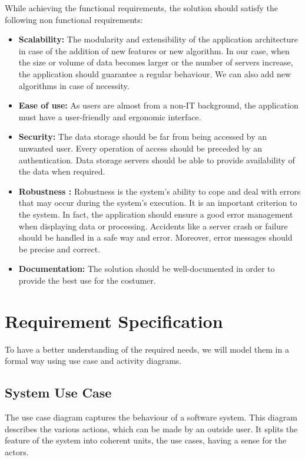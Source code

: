 While achieving the functional requirements, the solution should satisfy the following non functional requirements:
\begin{itemize}
\item \textbf{Scalability:} The modularity and extensibility of the application architecture in case of the addition of new features or new algorithm. In our case, when the size or volume of data becomes larger or the number of servers increase, the application should guarantee a regular behaviour. We can also add new algorithms in case of necessity. 
\item \textbf{Ease of use:} As users are almost from a non-IT background, the application must have a user-friendly and ergonomic interface.
\item \textbf{Security:} The data storage should be far from being accessed by an unwanted user. Every operation of access should be preceded by an authentication. Data storage servers should be able to provide availability of the data when required.
\item \textbf{Robustness :} Robustness is the system's ability to cope and deal with errors that may occur during the system's execution. It is an important criterion to the system. In fact, the application should ensure a good error management when displaying data or processing. Accidents
like a server crash or failure should be handled in a safe way and error. Moreover, error messages should be precise and correct.

\item \textbf{Documentation:} The solution should be well-documented in order to provide the best use for the costumer.
\end{itemize}
\section{Requirement Specification}
To have a better understanding of the required needs, we will model them in a formal way using use case and activity diagrams.
\subsection{System Use Case}
The use case diagram captures the behaviour of a software system. This diagram describes
the various actions, which can be made by an outside user. It splits the feature of the system into coherent units, the use cases, having a sense for the actors.\\

